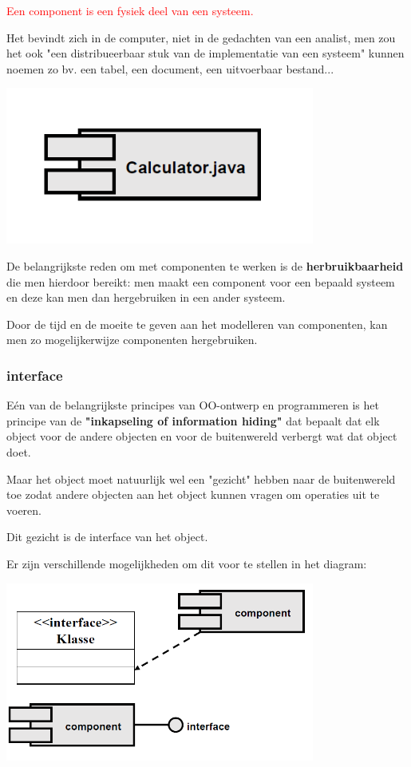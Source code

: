 \textcolor{red}{Een component is een fysiek deel van een systeem.}

Het bevindt zich in de computer, niet in de gedachten van een analist, men zou het ook "een distribueerbaar stuk van de implementatie van een systeem" kunnen noemen zo bv. een tabel, een document, een uitvoerbaar bestand...


\begin{center}
\includegraphics[width=4in]{img/component}%
\end{center}

De belangrijkste reden om met componenten te werken is de \textbf{herbruikbaarheid} die men hierdoor bereikt: men maakt een component voor een bepaald systeem en deze kan men dan hergebruiken in een ander systeem.

Door de tijd en de moeite te geven aan het modelleren van componenten, kan men zo mogelijkerwijze componenten hergebruiken.

\subsubsection{interface}

Eén van de belangrijkste principes van OO-ontwerp en programmeren is het principe van de \textbf{"inkapseling of information hiding"} dat bepaalt dat elk object voor de andere objecten en voor de buitenwereld verbergt wat dat object doet.

Maar het object moet natuurlijk wel een "gezicht" hebben naar de buitenwereld toe zodat andere objecten aan het object kunnen vragen om operaties uit te voeren.

Dit gezicht is de interface van het object.

Er zijn verschillende mogelijkheden om dit voor te stellen in het diagram:


\begin{center}
\includegraphics[width=4in]{img/interface}%
\end{center}


